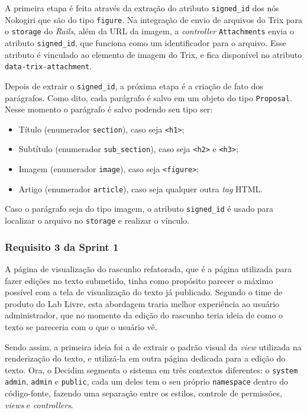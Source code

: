 A primeira etapa é feita através da extração do atributo \texttt{signed\_id} dos nós Nokogiri que são do tipo \texttt{figure}. Na integração de envio de arquivos do Trix para o \texttt{storage} do \textit{Rails}, além da URL da imagem, a \textit{controller} \texttt{Attachments} envia o atributo \texttt{signed\_id}, que funciona como um identificador para o arquivo. Esse atributo é vinculado ao elemento de imagem do Trix, e fica disponível no atributo \texttt{data-trix-attachment}.

Depois de extrair o \texttt{signed\_id}, a próxima etapa é a criação de fato dos parágrafos. Como dito, cada parágrafo é salvo em um objeto do tipo \texttt{Proposal}. Nesse momento o parágrafo é salvo podendo seu tipo ser:

\begin{itemize}
	\item Título (enumerador \texttt{section}), caso seja \texttt{<h1>};
	\item Subtítulo (enumerador \texttt{sub\_section}), caso seja \texttt{<h2>} e \texttt{<h3>};
	\item Imagem (enumerador \texttt{image}), caso seja \texttt{<figure>};
	\item Artigo (enumerador \texttt{article}), caso seja qualquer outra \textit{tag} HTML.
\end{itemize}

Caso o parágrafo seja do tipo imagem, o atributo \texttt{signed\_id} é usado para localizar o arquivo no \texttt{storage} e realizar o vínculo.

\subsubsection {Requisito 3 da Sprint 1}

A página de visualização do rascunho refatorada, que é a página utilizada para fazer edições no texto submetido, tinha como propósito parecer o máximo possível com a tela de visualização do texto já publicado. Segundo o time de produto do Lab Livre, esta abordagem traria melhor experiência ao usuário administrador, que no momento da edição do rascunho teria ideia de como o texto se pareceria com o que o usuário vê.

Sendo assim, a primeira ideia foi a de extrair o padrão visual da \textit{view} utilizada na renderização do texto, e utilizá-la em outra página dedicada para a edição do texto. Ora, o Decidim segmenta o sistema em três contextos diferentes: o \texttt{system admin}, \texttt{admin} e \texttt{public}, cada um deles tem o seu próprio \texttt{namespace} dentro do código-fonte, fazendo uma separação entre os estilos, controle de permissões, \textit{views} e \textit{controllers}.


